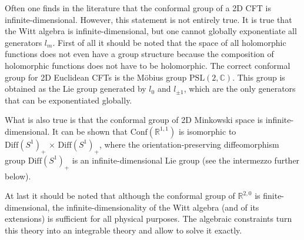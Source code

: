 
    \begin{remark}
        Often one finds in the literature that the conformal group of a 2D CFT is infinite-dimensional. However, this statement is not entirely true. It is true that the Witt algebra is infinite-dimensional, but one cannot globally exponentiate all generators $l_m$. First of all it should be noted that the space of all holomorphic functions does not even have a group structure because the composition of holomorphic functions does not have to be holomorphic. The correct conformal group for 2D Euclidean CFTs is the M\"obius group $\mathrm{PSL}(2,\mathbb{C})$. This group is obtained as the Lie group generated by $l_0$ and $l_{\pm1}$, which are the only generators that can be exponentiated globally.

        What is also true is that the conformal group of 2D Minkowski space is infinite-dimensional. It can be shown that $\mathrm{Conf}(\mathbb{R}^{1,1})$ is isomorphic to $\mathrm{Diff}(S^1)_+\,\times\,\mathrm{Diff}(S^1)_+$, where the orientation-preserving diffeomorphism group $\mathrm{Diff}(S^1)_+$ is an infinite-dimensional Lie group (see the intermezzo further below).

        At last it should be noted that although the conformal group of $\mathbb{R}^{2,0}$ is finite-dimensional, the infinite-dimensionality of the Witt algebra (and of its extensions) is sufficient for all physical purposes. The algebraic constraints turn this theory into an integrable theory and allow to solve it exactly.
    \end{remark}



